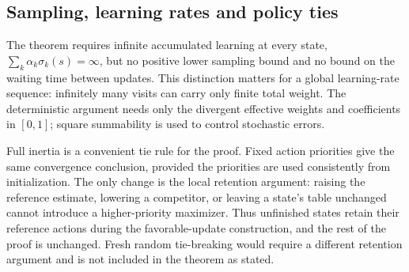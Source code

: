 


\subsection{Sampling, learning rates and policy ties}
\label{sec: relaxing conditions}
The theorem requires infinite accumulated learning at every state, $\sum_k\alpha_k\sigma_k(s)=\infty$, but no positive lower sampling bound and no bound on the waiting time between updates. This distinction matters for a global learning-rate sequence: infinitely many visits can carry only finite total weight. The deterministic argument needs only the divergent effective weights and coefficients in $[0,1]$; square summability is used to control stochastic errors.

Full inertia is a convenient tie rule for the proof. Fixed action priorities give the same convergence conclusion, provided the priorities are used consistently from initialization. The only change is the local retention argument: raising the reference estimate, lowering a competitor, or leaving a state's table unchanged cannot introduce a higher-priority maximizer. Thus unfinished states retain their reference actions during the favorable-update construction, and the rest of the proof is unchanged. Fresh random tie-breaking would require a different retention argument and is not included in the theorem as stated.

